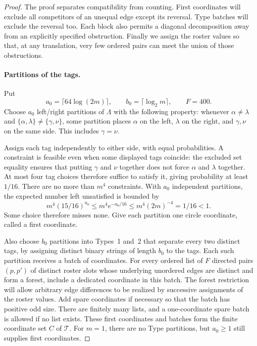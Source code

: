 \begin{proof}
The proof separates compatibility from counting. First coordinates will
exclude all competitors of an unequal edge except its reversal. Type
batches will exclude the reversal too. Each block also permits a diagonal
decomposition away from an explicitly specified obstruction. Finally we
assign the roster values so that, at any translation, very few ordered
pairs can meet the union of those obstructions.

\paragraph{Partitions of the tags.}
Put
\[
        a_0=\lceil64\log(2m)\rceil,\qquad
        b_0=\lceil\log_2m\rceil,\qquad F=400.
\]
Choose $a_0$ left/right partitions of $\Lambda$ with the following
property: whenever $\alpha\ne\lambda$ and
$\{\alpha,\lambda\}\ne\{\gamma,\nu\}$, some partition places
$\alpha$ on the left, $\lambda$ on the right, and $\gamma,\nu$ on
the same side. This includes $\gamma=\nu$.

Assign each tag independently to either side, with equal probabilities.
A constraint is feasible even when some displayed tags coincide: the
excluded set equality ensures that putting $\gamma$ and $\nu$ together
does not force $\alpha$ and $\lambda$ together. At most four tag choices
therefore suffice to satisfy it, giving probability at least $1/16$.
There are no more than $m^4$ constraints. With $a_0$ independent
partitions, the expected number left unsatisfied is bounded by
\[
         m^4(15/16)^{a_0}
          \le m^4e^{-a_0/16}\le m^4(2m)^{-4}=1/16<1.
\]
Some choice therefore misses none. Give each partition one circle
coordinate, called a first coordinate.

Also choose $b_0$ partitions into Types~1 and~2 that separate every
two distinct tags, by assigning distinct binary strings of length
$b_0$ to the tags. Each such partition receives a batch of coordinates.
For every ordered list of $F$ directed pairs $(p,p')$ of distinct
roster slots whose underlying unordered edges are distinct and form
a forest, include a dedicated coordinate in this batch. The forest
restriction will allow arbitrary edge differences to be realized by
successive assignments of the roster values. Add spare coordinates if
necessary so that the batch has positive odd size.
There are finitely many lists, and a one-coordinate spare batch is
allowed if no list exists. These first coordinates and batches form
the finite coordinate set $C$ of $\mathcal T$. For $m=1$, there are
no Type partitions, but $a_0\ge1$ still supplies first coordinates.


\end{proof}
